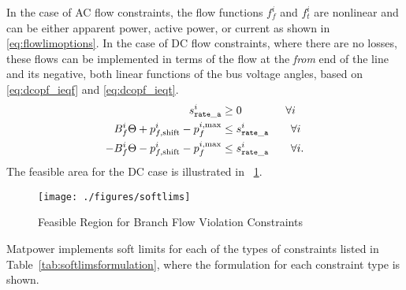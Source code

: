 \documentclass[12pt]{article}
\newcommand{\matpower}[0]{{\sc Matpower}}
\numberwithin{equation}{section}
\numberwithin{table}{section}
\numberwithin{figure}{section}
\begin{document}
In the case of AC flow constraints, the flow functions $f_f^i$ and $f_t^i$ are nonlinear and can be either apparent power, active power, or current as shown in \eqref{eq:flowlimoptions}. In the case of DC flow constraints, where there are no losses, these flows can be implemented in terms of the flow at the \emph{from} end of the line and its negative, both linear functions of the bus voltage angles, based on \eqref{eq:dcopf_ieqf} and \eqref{eq:dcopf_ieqt}.
\begin{align}
s_{\tt{rate\_a}}^i &\ge 0 \qquad\qquad \forall{i}\\
B_f^i \Theta + p_{f,\mathrm{shift}}^i -  p_f^{i,\mathrm{max}} &\le s_{\tt{rate\_a}}^i \qquad \forall{i}  \\
-B_f^i \Theta - p_{f,\mathrm{shift}}^i -  p_f^{i,\mathrm{max}} &\le s_{\tt{rate\_a}}^i \qquad \forall{i}. \label{eq:softlimconstraint}
\end{align}
The feasible area for the DC case is illustrated in \figurename~\ref{fig:softlims}.

\begin{figure}[!th]
  \centering
  \texttt{[image: ./figures/softlims]}
  \caption{Feasible Region for Branch Flow Violation Constraints}
  \label{fig:softlims}
\end{figure}

\matpower{} implements soft limits for each of the types of constraints listed in Table~\ref{tab:softlimsformulation}, where the formulation for each constraint type is shown.
\end{document}
